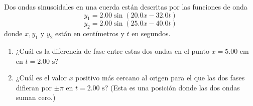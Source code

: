 \item Dos ondas sinusoidales en una cuerda están descritas por las funciones de onda
$$ y_1 = 2.00 \sin (20.0x - 32.0t) $$
$$ y_2 = 2.00 \sin (25.0x - 40.0t) $$
donde $x, y_1$ y $y_2$ están en centímetros y $t$ en segundos.
\begin{enumerate}
    \item ¿Cuál es la diferencia de fase entre estas dos ondas en el punto $x = 5.00\text{ cm}$ en $t = 2.00\text{ s}$?
    \item ¿Cuál es el valor $x$ positivo más cercano al origen para el que las dos fases difieran por $\pm\pi$ en $t = 2.00\text{ s}$? (Esta es una posición donde las dos ondas suman cero.)
\end{enumerate}